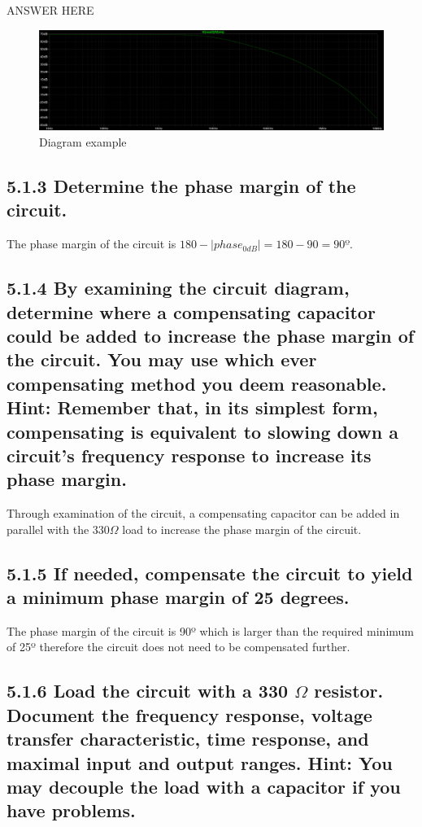 \documentclass[12pt]{article}
\begin{document}
ANSWER HERE

\begin{figure}[H]
    \centering
    \includegraphics[width=1.0\textwidth]{512.1.PNG}
    \caption{Diagram example}
\end{figure}
    

\subsection*{5.1.3 Determine the phase margin of the circuit.}

The phase margin of the circuit is $180 -  |phase_{0dB}| = 180 - 90 = 90º$.

\subsection*{5.1.4 By examining the circuit diagram, determine where a 
compensating capacitor could be added to increase the phase margin of the circuit. 
You may use which ever compensating method you deem reasonable. Hint: Remember that, 
in its simplest form, compensating is equivalent to slowing down a circuit’s frequency 
response to increase its phase margin.}

Through examination of the circuit, a compensating capacitor can be added in parallel with the $330\Omega$ load to increase the phase margin of the circuit.

\subsection*{5.1.5 If needed, compensate the circuit to yield a minimum phase margin of 25 degrees.  }

The phase margin of the circuit is 90º which is larger than the required minimum of 25º therefore the circuit does not need to be compensated further.

\subsection*{5.1.6 Load the circuit with a 330 $\Omega$ resistor. Document the frequency response, 
voltage transfer characteristic, time response, and maximal input and output ranges. 
Hint: You may decouple the load with a capacitor if you have problems.}
\end{document}
